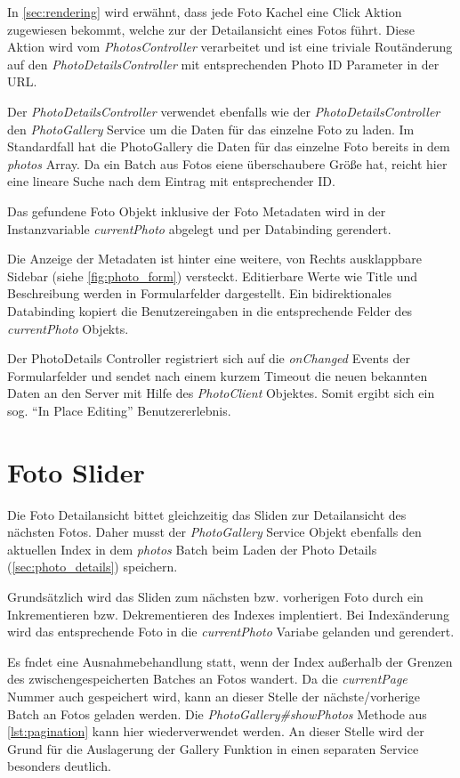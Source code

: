 In \ref{sec:rendering} wird erwähnt, dass jede Foto Kachel eine Click Aktion zugewiesen bekommt, welche zur der Detailansicht eines Fotos führt. Diese Aktion wird vom \textit{PhotosController} verarbeitet und ist eine triviale Routänderung auf den \textit{PhotoDetailsController} mit entsprechenden Photo ID Parameter in der URL.

Der \textit{PhotoDetailsController} verwendet ebenfalls wie der \textit{PhotoDetailsController} den \textit{PhotoGallery} Service um die Daten für das einzelne Foto zu laden. Im Standardfall hat die PhotoGallery die Daten für das einzelne Foto bereits in dem \textit{photos} Array. Da ein Batch aus Fotos eiene überschaubere Größe hat, reicht hier eine lineare Suche nach dem Eintrag mit entsprechender ID. 

Das gefundene Foto Objekt inklusive der Foto Metadaten wird in der Instanzvariable \textit{currentPhoto} abgelegt und per Databinding gerendert. 

Die Anzeige der Metadaten ist hinter eine weitere, von Rechts ausklappbare Sidebar (siehe \ref{fig:photo_form}) versteckt. Editierbare Werte wie Title und Beschreibung werden in Formularfelder dargestellt. Ein bidirektionales Databinding kopiert die Benutzereingaben in die entsprechende Felder des \textit{currentPhoto} Objekts. 

Der PhotoDetails Controller registriert sich auf die \textit{onChanged } Events der Formularfelder und sendet nach einem kurzem Timeout die neuen bekannten Daten an den Server mit Hilfe des \textit{PhotoClient} Objektes. Somit ergibt sich ein sog.
``In Place Editing'' Benutzererlebnis.

\section{Foto Slider}
\label{sec:photo_slider}

Die Foto Detailansicht bittet gleichzeitig das Sliden zur Detailansicht des nächsten Fotos. Daher musst der \textit{PhotoGallery} Service Objekt ebenfalls den aktuellen Index in dem \textit{photos} Batch beim Laden der Photo Details (\ref{sec:photo_details}) speichern.

Grundsätzlich wird das Sliden zum nächsten bzw. vorherigen Foto durch ein Inkrementieren bzw. Dekrementieren des Indexes implentiert. Bei Indexänderung wird das entsprechende Foto in die \textit{currentPhoto} Variabe gelanden und gerendert.

Es fndet eine Ausnahmebehandlung statt, wenn der Index außerhalb der Grenzen des zwischengespeicherten Batches an Fotos wandert. Da die \textit{currentPage} Nummer auch gespeichert wird, kann an dieser Stelle der nächste/vorherige Batch an Fotos geladen werden. Die \textit{PhotoGallery\#showPhotos} Methode aus \ref{lst:pagination} kann hier wiederverwendet werden. An dieser Stelle wird der Grund für die Auslagerung der Gallery Funktion in einen separaten Service besonders deutlich.


